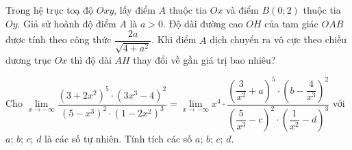 \begin{ex}%
	Trong hệ trục toạ độ $Oxy$, lấy điểm $A$ thuộc tia $Ox$ và điểm $B\left(0;2\right)$ thuộc tia $Oy$. Giả sử hoành  độ điểm $A$ là $ a>0$. Độ dài đường cao $OH$ của tam giác $OAB$ được tính theo công thức $\dfrac{2a}{\sqrt{4+{a^2}}}$. Khi điểm $A$ dịch chuyển ra vô cực theo chiều dương trục $Ox$ thì độ dài $AH$ thay đổi về gần giá trị bao nhiêu?
\end{ex}

\begin{ex}%
	Cho $\lim\limits_{x\to-\infty}\dfrac{\left(3+2x^2\right)^5\cdot\left(3x^3-4\right)^2}{\left(5-x^3\right)^2\cdot  \left(1-2x^2\right)^3}=\lim\limits_{x\to-\infty }x^4\cdot\dfrac{\left(\dfrac3{x^2}+a\right)^5\cdot\left(b-\dfrac4{x^3}\right)^2}{\left(\dfrac5{x^3}-c\right)^2\cdot\left(\dfrac1{x^2}-d\right)^3}$ với $a$; $b$; $c$; $d$ là các số tự nhiên. Tính tích các số $a$; $b$; $c$; $d$.
\end{ex}

